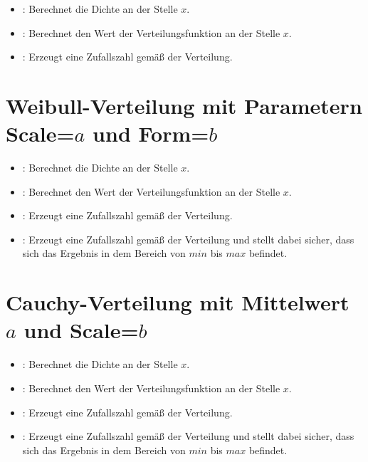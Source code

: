 \begin{itemize}

\item
{}:
Berechnet die Dichte an der Stelle $x$.

\item
{}:
Berechnet den Wert der Verteilungsfunktion an der Stelle $x$.

\item
{}:
Erzeugt eine Zufallszahl gemäß der Verteilung.

\end{itemize}



\section{Weibull-Verteilung mit Parametern Scale=\texorpdfstring{$a$}{a} und Form=\texorpdfstring{$b$}{b}}

\begin{itemize}

\item
{}:
Berechnet die Dichte an der Stelle $x$.

\item
{}:
Berechnet den Wert der Verteilungsfunktion an der Stelle $x$.

\item
{}:
Erzeugt eine Zufallszahl gemäß der Verteilung.

\item
{}:
Erzeugt eine Zufallszahl gemäß der Verteilung und stellt dabei sicher, dass sich das Ergebnis in dem Bereich von $min$ bis $max$ befindet.

\end{itemize}



\section{Cauchy-Verteilung mit Mittelwert \texorpdfstring{$a$}{a} und Scale=\texorpdfstring{$b$}{b}}

\begin{itemize}

\item
{}:
Berechnet die Dichte an der Stelle $x$.

\item
{}:
Berechnet den Wert der Verteilungsfunktion an der Stelle $x$.

\item
{}:
Erzeugt eine Zufallszahl gemäß der Verteilung.

\item
{}:
Erzeugt eine Zufallszahl gemäß der Verteilung und stellt dabei sicher, dass sich das Ergebnis in dem Bereich von $min$ bis $max$ befindet.

\end{itemize}



